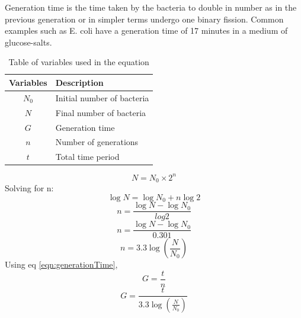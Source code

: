 Generation time is the time taken by the bacteria to double in number as in the previous generation or in simpler terms undergo one binary fission. Common examples such as E. coli have a generation time of 17 minutes in a medium of glucose-salts.

\begin{table}[h]
	\begin{center}
\begin{tabular}{|c|l|}
\hline
	Variables & Description \\
\hline
	$N_0$ & Initial number of bacteria \\
	$N$ & Final number of bacteria \\
	$G$ & Generation time \\
	$n$ & Number of generations \\
	$t$ & Total time period \\
\hline
\end{tabular}
	\caption{Table of variables used in the equation}
	\label{tab:varTimeTable}
	\end{center}
\end{table}

	\[{N} = {N_0}\times{2^n}\]
	Solving for n:
	\[\log{N} = \log{N_0}+{n}\log{2}\]
	\[{n} = \frac{\log{N}-\log{N_0}}{log{2}}\]
    \[{n} = \frac{\log{N}-\log{N_0}}{0.301}\]
    \[{n} = {3.3}\log({\frac{N}{N_0}})\]
    Using eq \ref{eqn:generationTime},
    \[{G} = \frac{t}{n}\]
    \begin{equation}
        {G} = \frac{t}{{3.3}\log({\frac{N}{N_0}})}
    \end{equation}
    
    
\nocite{*}


